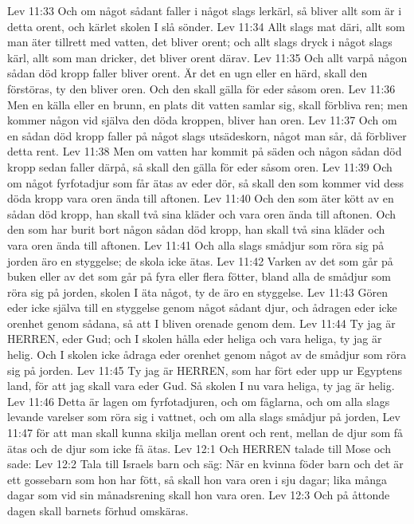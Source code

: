 Lev 11:33  Och om något sådant faller i något slags lerkärl, så bliver allt som är i detta orent, och kärlet skolen I slå sönder.
Lev 11:34  Allt slags mat däri, allt som man äter tillrett med vatten, det bliver orent; och allt slags dryck i något slags kärl, allt som man dricker, det bliver orent därav.
Lev 11:35  Och allt varpå någon sådan död kropp faller bliver orent. Är det en ugn eller en härd, skall den förstöras, ty den bliver oren. Och den skall gälla för eder såsom oren.
Lev 11:36  Men en källa eller en brunn, en plats dit vatten samlar sig, skall förbliva ren; men kommer någon vid själva den döda kroppen, bliver han oren.
Lev 11:37  Och om en sådan död kropp faller på något slags utsädeskorn, något man sår, då förbliver detta rent.
Lev 11:38  Men om vatten har kommit på säden och någon sådan död kropp sedan faller därpå, så skall den gälla för eder såsom oren.
Lev 11:39  Och om något fyrfotadjur som får ätas av eder dör, så skall den som kommer vid dess döda kropp vara oren ända till aftonen.
Lev 11:40  Och den som äter kött av en sådan död kropp, han skall två sina kläder och vara oren ända till aftonen. Och den som har burit bort någon sådan död kropp, han skall två sina kläder och vara oren ända till aftonen.
Lev 11:41  Och alla slags smådjur som röra sig på jorden äro en styggelse; de skola icke ätas.
Lev 11:42  Varken av det som går på buken eller av det som går på fyra eller flera fötter, bland alla de smådjur som röra sig på jorden, skolen I äta något, ty de äro en styggelse.
Lev 11:43  Gören eder icke själva till en styggelse genom något sådant djur, och ådragen eder icke orenhet genom sådana, så att I bliven orenade genom dem.
Lev 11:44  Ty jag är HERREN, eder Gud; och I skolen hålla eder heliga och vara heliga, ty jag är helig. Och I skolen icke ådraga eder orenhet genom något av de smådjur som röra sig på jorden.
Lev 11:45  Ty jag är HERREN, som har fört eder upp ur Egyptens land, för att jag skall vara eder Gud. Så skolen I nu vara heliga, ty jag är helig.
Lev 11:46  Detta är lagen om fyrfotadjuren, och om fåglarna, och om alla slags levande varelser som röra sig i vattnet, och om alla slags smådjur på jorden,
Lev 11:47  för att man skall kunna skilja mellan orent och rent, mellan de djur som få ätas och de djur som icke få ätas.
Lev 12:1  Och HERREN talade till Mose och sade:
Lev 12:2  Tala till Israels barn och säg: När en kvinna föder barn och det är ett gossebarn som hon har fött, så skall hon vara oren i sju dagar; lika många dagar som vid sin månadsrening skall hon vara oren.
Lev 12:3  Och på åttonde dagen skall barnets förhud omskäras.
